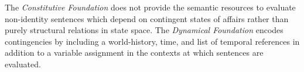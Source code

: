 \documentclass[../LogosReference.tex]{subfiles}
\begin{document}
\begin{remark}
	The \textit{Constitutive Foundation} does not provide the semantic resources to evaluate non-identity sentences which depend on contingent states of affairs rather than purely structural relations in state space.
	The \textit{Dynamical Foundation} encodes contingencies by including a world-history, time, and list of temporal references in addition to a variable assignment in the contexts at which sentences are evaluated.
\end{remark}
\end{document}
